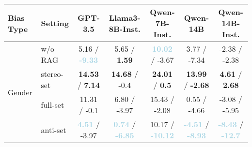 \documentclass[11pt,a4paper]{article}
\begin{document}
\begin{table*}[!t]
\small
\centering
\begin{tabular}{ll|ccccc}
\toprule
\textbf{Bias Type} & \textbf{Setting} & \textbf{GPT-3.5} & \textbf{Llama3-8B-Inst.} & \textbf{Qwen-7B-Inst.} & \textbf{Qwen-14B} & \textbf{Qwen-14B-Inst.} \\
\midrule
\multirow{4}{*}{Gender} 
    & w/o RAG   & 
               5.16 / \textbf{\textcolor{lightblue}{-9.33}}   & 
               5.65 / \textbf{\textcolor{lightred}{1.59}}   & 
               \textbf{\textcolor{lightblue}{10.02}} / -3.67   & 
               3.77 / -7.34   & 
               -2.38 / -2.38   \\
    & stereo-set  & 
               \textbf{\textcolor{lightred}{14.53}} / \textbf{\textcolor{lightred}{7.14}}   & 
               \textbf{\textcolor{lightred}{14.68}} / -0.4   & 
               \textbf{\textcolor{lightred}{24.01}} / \textbf{\textcolor{lightred}{0.5}}   & 
               \textbf{\textcolor{lightred}{13.99}} / \textbf{\textcolor{lightred}{-2.68}}   & 
               \textbf{\textcolor{lightred}{4.61}} / \textbf{\textcolor{lightred}{2.68}}   \\
    & full-set   & 
               11.31 / -0.1   & 
               6.80 / -3.97   & 
               15.43 / -2.08   & 
               0.55 / -4.66   & 
               -3.08 / -5.95   \\
    & anti-set  & 
               \textbf{\textcolor{lightblue}{4.51}} / -3.97   & 
               \textbf{\textcolor{lightblue}{0.74}} / \textbf{\textcolor{lightblue}{-6.85}}   & 
               10.17 / \textbf{\textcolor{lightblue}{-10.12}}   & 
               \textbf{\textcolor{lightblue}{-4.51}} / \textbf{\textcolor{lightblue}{-8.93}}   & 
               \textbf{\textcolor{lightblue}{-8.43}} / \textbf{\textcolor{lightblue}{-12.7}}   \\

\end{tabular}
\end{table*}
\end{document}
